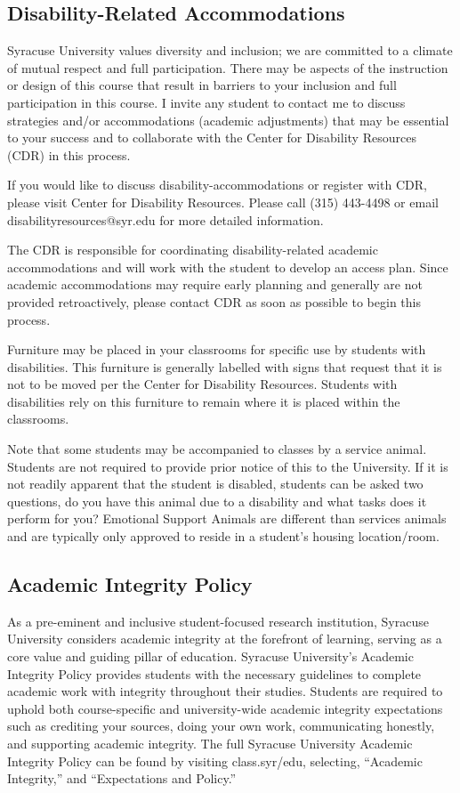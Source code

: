 \documentclass[12pt]{article}
\begin{document}
\subsection*{Disability-Related Accommodations}

Syracuse University values diversity and inclusion; we are committed to a climate of mutual respect and full participation. There may be aspects of the instruction or design of this course that result in barriers to your inclusion and full participation in this course. I invite any student to contact me to discuss strategies and/or accommodations (academic adjustments) that may be essential to your success and to collaborate with the Center for Disability Resources (CDR) in this process.

If you would like to discuss disability-accommodations or register with CDR, please visit Center for Disability Resources. Please call (315) 443-4498 or email disabilityresources@syr.edu for more detailed information.

The CDR is responsible for coordinating disability-related academic accommodations and will work with the student to develop an access plan. Since academic accommodations may require early planning and generally are not provided retroactively, please contact CDR as soon as possible to begin this process.

Furniture may be placed in your classrooms for specific use by students with disabilities. This furniture is generally labelled with signs that request that it is not to be moved per the Center for Disability Resources. Students with disabilities rely on this furniture to remain where it is placed within the classrooms.

Note that some students may be accompanied to classes by a service animal. Students are not required to provide prior notice of this to the University. If it is not readily apparent that the student is disabled, students can be asked two questions, do you have this animal due to a disability and what tasks does it perform for you? Emotional Support Animals are different than services animals and are typically only approved to reside in a student’s housing location/room.

\subsection*{Academic Integrity Policy}

As a pre-eminent and inclusive student-focused research institution, Syracuse University considers academic integrity at the forefront of learning, serving as a core value and guiding pillar of education. Syracuse University’s Academic Integrity Policy provides students with the necessary guidelines to complete academic work with integrity throughout their studies. Students are required to uphold both course-specific and university-wide academic integrity expectations such as crediting your sources, doing your own work, communicating honestly, and supporting academic integrity. The full Syracuse University Academic Integrity Policy can be found by visiting class.syr/edu, selecting, “Academic Integrity,” and “Expectations and Policy.”
\end{document}
